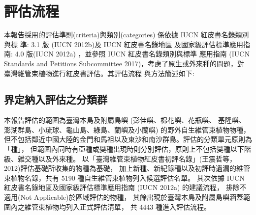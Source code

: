 \chapter{評估流程}

\begin{multicols}{2}
本報告採用的評估準則(criteria)與類別(categories) 係依據 IUCN 紅皮書名錄類別與標 準: 3.1 版 (IUCN 2012b)及 IUCN 紅皮書名錄地區 及國家級評估標準應用指南: 4.0 版(IUCN 2012a) ，並參照 IUCN 紅皮書名錄類別與標準 應用指南 (IUCN Standards and Petitions Subcommittee 2017)，考慮了原生或外來種的問題，對 臺灣維管束植物進行紅皮書評估。其評估流程 與方法簡述如下:
\end{multicols}
\section{界定納入評估之分類群}
\begin{multicols}{2}
本報告評估的範圍為臺灣本島及附屬島嶼 (彭佳嶼、棉花嶼、花瓶嶼、
基隆嶼、澎湖群島、小琉球、龜山島、綠島、蘭嶼及小蘭嶼) 的野外自生維管束植物物種，
但不包括鄰近中國大陸的金門和馬祖以及東沙和南沙群島。評估的分類單元原則為「種」，
但範圍內同時有亞種或變種出現時則分別評估，原則上不包括變種以下階級、雜交種以及外來種。
以「臺灣維管束植物紅皮書初評名錄」(王震哲等，2012)評估基礎所收集的物種為基礎，
加上新種、新紀錄種以及初評時遺漏的維管束植物名錄，共有 5190 種自生維管束植物列入候選評估名單。
其次依據 IUCN 紅皮書名錄地區及國家級評估標準應用指南 (IUCN 2012a) 的建議流程，
排除不適用(Not Applicable)於區域評估的物種，
其餘出現於臺灣本島及附屬島嶼涵蓋範圍內之維管束植物均列入正式評估清單，
共 4443 種進入評估流程。
\end{multicols}
